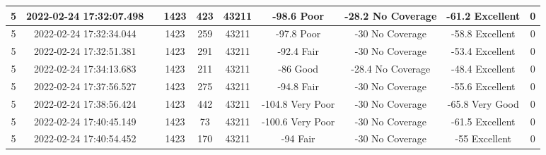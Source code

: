 \begin{longtable*}{|c|c|c|c|c|c|c|c|c|c|}
5&2022-02-24 17:32:07.498&&1423&423&43211& -98.6     Poor        & -28.2     No Coverage & -61.2     Excellent   & 0\\\hline
{}5&2022-02-24 17:32:34.044&&1423&259&43211& -97.8     Poor        & -30       No Coverage & -58.8     Excellent   & 0\\\hline
{}5&2022-02-24 17:32:51.381&&1423&291&43211& -92.4     Fair        & -30       No Coverage & -53.4     Excellent   & 0\\\hline
{}5&2022-02-24 17:34:13.683&&1423&211&43211& -86       Good        & -28.4     No Coverage & -48.4     Excellent   & 0\\\hline
{}5&2022-02-24 17:37:56.527&&1423&275&43211& -94.8     Fair        & -30       No Coverage & -55.6     Excellent   & 0\\\hline
{}5&2022-02-24 17:38:56.424&&1423&442&43211& -104.8    Very Poor   & -30       No Coverage & -65.8     Very Good   & 0\\\hline
{}5&2022-02-24 17:40:45.149&&1423&73&43211& -100.6    Very Poor   & -30       No Coverage & -61.5     Excellent   & 0\\\hline
{}5&2022-02-24 17:40:54.452&&1423&170&43211& -94       Fair        & -30       No Coverage & -55       Excellent   & 0\\\hline

\end{longtable*}
